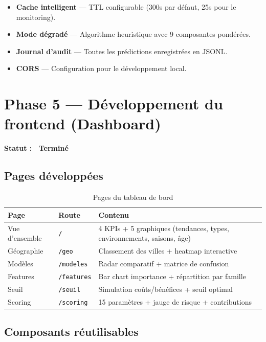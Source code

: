 \documentclass[a4paper,12pt]{report}
\newcommand{\done}{\textcolor{done}{\checkmark\ Terminé}}
\begin{document}
\begin{itemize}
    \item \textbf{Cache intelligent} — TTL configurable (300s par défaut, 25s pour le monitoring).
    \item \textbf{Mode dégradé} — Algorithme heuristique avec 9 composantes pondérées.
    \item \textbf{Journal d'audit} — Toutes les prédictions enregistrées en JSONL.
    \item \textbf{CORS} — Configuration pour le développement local.
\end{itemize}

\section{Phase 5 — Développement du frontend (Dashboard)}

\textbf{Statut : \done}

\subsection{Pages développées}

\begin{table}[h!]
\centering
\renewcommand{\arraystretch}{1.4}
\begin{tabularx}{\textwidth}{|l|l|X|}
\hline
\rowcolor{bpmblue!10}
\textbf{Page} & \textbf{Route} & \textbf{Contenu} \\
\hline
Vue d'ensemble & \texttt{/} & 4 KPIs + 5 graphiques (tendances, types, environnements, saisons, âge) \\
\hline
Géographie & \texttt{/geo} & Classement des villes + heatmap interactive \\
\hline
Modèles & \texttt{/modeles} & Radar comparatif + matrice de confusion \\
\hline
Features & \texttt{/features} & Bar chart importance + répartition par famille \\
\hline
Seuil & \texttt{/seuil} & Simulation coûts/bénéfices + seuil optimal \\
\hline
Scoring & \texttt{/scoring} & 15 paramètres + jauge de risque + contributions \\
\hline
\end{tabularx}
\caption{Pages du tableau de bord}
\end{table}

\subsection{Composants réutilisables}
\end{document}
